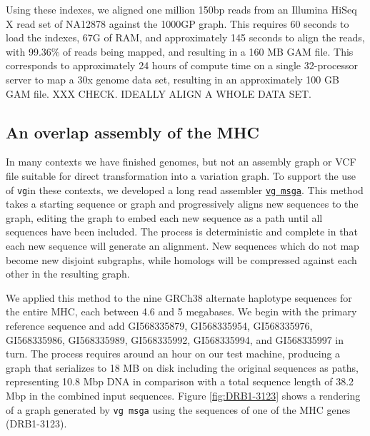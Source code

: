 \documentclass[12pt]{article}
\newcommand{\vg}{{\tt vg}}
\begin{document}
Using these indexes, we aligned one million 150bp reads from an Illumina HiSeq X read set of NA12878 against the 1000GP graph.
This requires 60 seconds to load the indexes, 67G of RAM, and approximately 145 seconds to align the reads, with 99.36\% of reads being mapped, and resulting in a 160 MB
GAM file.  This corresponds to approximately 24 hours of compute time on a single 32-processor server to map a 30x genome data set, resulting in an approximately 100 GB GAM file.  XXX CHECK.  IDEALLY ALIGN A WHOLE DATA SET.

\subsection{An overlap assembly of the MHC}
\label{sec:MHC}

In many contexts we have finished genomes, but not an assembly graph or VCF file suitable for direct transformation into a variation graph. 
To support the use of \vg in these contexts,
we developed a long read assembler \href{https://github.com/vgteam/vg/wiki/Long-read-assemblies-using-vg-msga}{\tt vg msga}.
This method takes a starting sequence or graph and progressively aligns new sequences to the graph, editing the graph to embed each new sequence as a path until all sequences have been included.
The process is deterministic and complete in that each new sequence will generate an alignment.
New sequences which do not map become new disjoint subgraphs, while homologs will be compressed against each other in the resulting graph.

We applied this method to the nine GRCh38 alternate haplotype sequences for the entire MHC, each between 4.6 and 5 megabases.
We begin with the primary reference sequence and add GI568335879, GI568335954, GI568335976, GI568335986, GI568335989, GI568335992, GI568335994, and GI568335997 in turn.
The process requires around an hour on our test machine, producing a graph that serializes to 18 MB on disk including the original sequences as paths, representing 10.8 Mbp DNA in comparison with a total sequence length of 38.2 Mbp in the combined input sequences. 
Figure \ref{fig:DRB1-3123} shows a rendering of a graph generated by {\tt vg msga} using the sequences of one of the MHC genes (DRB1-3123).

\end{document}
